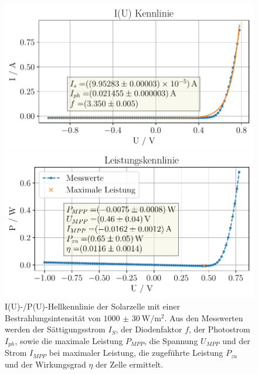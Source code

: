 \documentclass[english, ngerman]{scrartcl}
\begin{document}
\setcapindent{0pt}
\begin{figure}[H]
    \centering
    \begin{minipage}[t]{0.485\linewidth}
        \centering
        \includegraphics[width=\linewidth]{fig/plots/1000_UI.pdf}
    \end{minipage}%
    \hspace*{\fill}
    \begin{minipage}[t]{0.485\linewidth}
        \centering
        \includegraphics[width=\linewidth]{fig/plots/1000_P.pdf}
    \end{minipage}
    \caption[I(U)-/P(U)-Hellkennlinie Solarzelle -- Sonnensimulator]{I(U)-/P(U)-Hellkennlinie der Solarzelle mit einer Bestrahlungsintensität von $\SI{1000(30)}{\watt\per\meter\squared}$. Aus den Messwerten werden der Sättigungsstrom $I_S$, der Diodenfaktor $f$, der Photostrom $I_{ph}$, sowie die maximale Leistung $P_{MPP}$, die Spannung $U_{MPP}$ und der Strom $I_{MPP}$ bei maximaler Leistung, die zugeführte Leistung $P_{zu}$ und der Wirkungsgrad $\eta$ der Zelle ermittelt.}
    \label{fig:solar_Hell_1000}
\end{figure}
\setcaphanging
\end{document}
